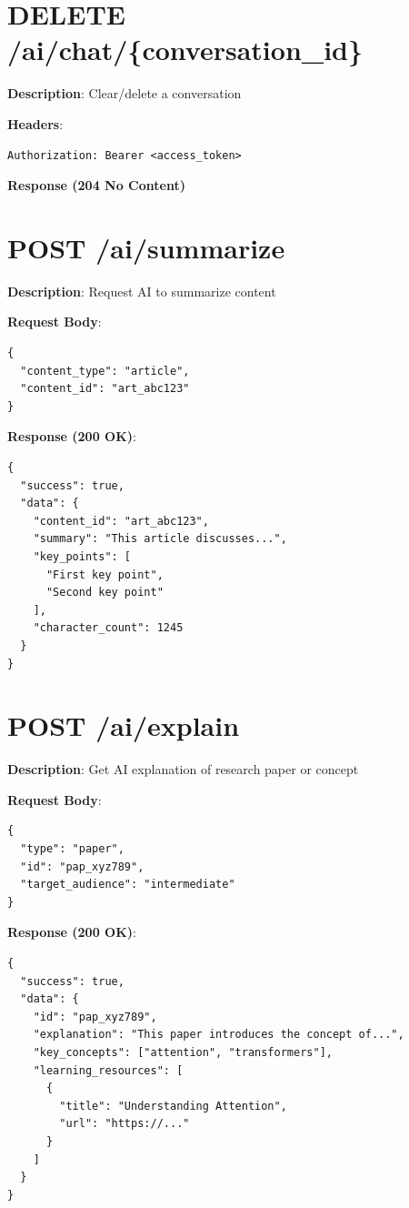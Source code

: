 \documentclass[12pt,a4paper]{report}
\begin{document}
\section{DELETE /ai/chat/\{conversation\_id\}}

\textbf{Description}: Clear/delete a conversation

\textbf{Headers}:
\begin{lstlisting}
Authorization: Bearer <access_token>
\end{lstlisting}

\textbf{Response (204 No Content)}

\section{POST /ai/summarize}

\textbf{Description}: Request AI to summarize content

\textbf{Request Body}:
\begin{lstlisting}
{
  "content_type": "article",
  "content_id": "art_abc123"
}
\end{lstlisting}

\textbf{Response (200 OK)}:
\begin{lstlisting}
{
  "success": true,
  "data": {
    "content_id": "art_abc123",
    "summary": "This article discusses...",
    "key_points": [
      "First key point",
      "Second key point"
    ],
    "character_count": 1245
  }
}
\end{lstlisting}

\section{POST /ai/explain}

\textbf{Description}: Get AI explanation of research paper or concept

\textbf{Request Body}:
\begin{lstlisting}
{
  "type": "paper",
  "id": "pap_xyz789",
  "target_audience": "intermediate"
}
\end{lstlisting}

\textbf{Response (200 OK)}:
\begin{lstlisting}
{
  "success": true,
  "data": {
    "id": "pap_xyz789",
    "explanation": "This paper introduces the concept of...",
    "key_concepts": ["attention", "transformers"],
    "learning_resources": [
      {
        "title": "Understanding Attention",
        "url": "https://..."
      }
    ]
  }
}
\end{lstlisting}
\end{document}
